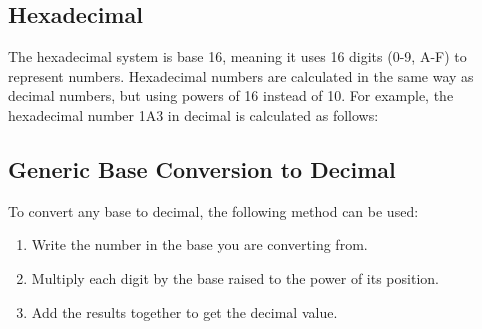 \documentclass{article}
\begin{document}
\vspace*{0.5cm}

\subsection*{Hexadecimal}

\noindent The hexadecimal system is base 16, meaning it uses 16 digits (0-9, A-F) to represent numbers. Hexadecimal numbers are calculated in the same way as decimal numbers, but using powers of 16 instead of 10. For example, the hexadecimal number 1A3 in decimal is calculated as follows:

\vspace*{0.5cm}


\newpage

\subsection*{Generic Base Conversion to Decimal}

\noindent To convert any base to decimal, the following method can be used:

\begin{enumerate}
    \item Write the number in the base you are converting from.
    \item Multiply each digit by the base raised to the power of its position.
    \item Add the results together to get the decimal value.
\end{enumerate}

\vspace*{0.25cm}
\end{document}
